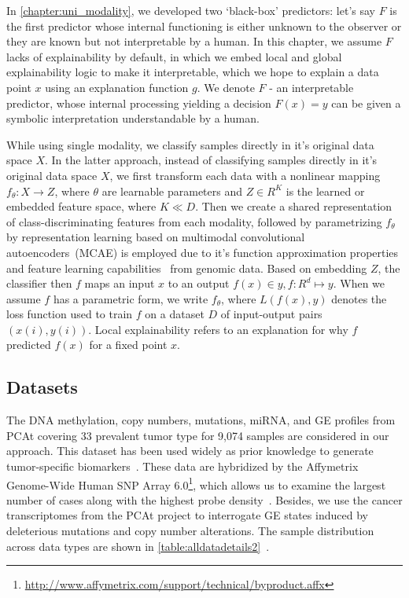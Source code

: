 \hspace*{3.5mm} In \cref{chapter:uni_modality}, we developed two `black-box' predictors: let's say $F$ is the first predictor whose internal functioning is either unknown to the observer or they are known but not interpretable by a human. In this chapter, we assume $F$ lacks of explainability by default, in which we embed local and global explainability logic to make it interpretable, which we hope to explain a data point $x$ using an explanation function $g$. We denote ${F}$ - an interpretable predictor, whose internal processing yielding a decision ${F}(x)=y$ can be given a symbolic interpretation understandable by a human. 

\hspace*{3.5mm} While using single modality, we classify samples directly in it's original data space $X$. In the latter approach, instead of classifying samples directly in it's original data space $X$, we first transform each data with a nonlinear mapping $f_{\theta}: X \rightarrow Z$, where $\theta$ are learnable parameters and $Z \in {R}^{K}$ is the learned or embedded feature space, where $K \ll D$. Then we create a shared representation of class-discriminating features from each modality, followed by parametrizing $f_{\theta}$ by representation learning based on multimodal convolutional autoencoders~(MCAE) is employed due to it's function approximation properties and feature learning capabilities~\cite{xie2016unsupervised,karim2019drug} from genomic data. Based on embedding $Z$, the classifier then $f$ maps an input $x$ to an output $f(x) \in y, f: {R}^{d} \mapsto y$. When we assume $f$ has a parametric form, we write $f_{\theta}$, where ${L}(f(x), y)$ denotes the loss function used to train $f$ on a dataset $D$ of input-output pairs $(x(i), y(i))$. Local explainability refers to an explanation for why $f$ predicted $f(x)$ for a fixed point $x$. 

\subsection{Datasets}
The DNA methylation, copy numbers, mutations, miRNA, and GE profiles from PCAt covering 33 prevalent tumor type for 9,074 samples are considered in our approach. This dataset has been used widely as prior knowledge to generate tumor-specific biomarkers~\cite{way2018machine,hoadley2018cell,malta2018machine}. These data are hybridized by the Affymetrix Genome-Wide Human SNP Array 6.0\footnote{\url{http://www.affymetrix.com/support/technical/byproduct.affx}}, which allows us to examine the largest number of cases along with the highest probe density~\cite{31Park}. Besides, we use the cancer transcriptomes from the PCAt project to interrogate GE states induced by deleterious mutations and copy number alterations. The sample distribution across data types are shown in \cref{table:alldatadetails2}~\cite{weinstein2013cancer}. 

